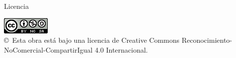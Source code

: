 \documentclass[english,a4paper,12pt,oneside]{extreport}
\begin{document}
\begin{huge}
Licencia
\end{huge}

\bigskip

\begin{center}
\includegraphics[scale=1.5]{images/by-nc-sa_88x31}\\[10mm]
{\Large \copyright~Esta obra está bajo una licencia de Creative Commons Reconocimiento-NoComercial-CompartirIgual 4.0 Internacional.
}
\end{center}
\end{document}
